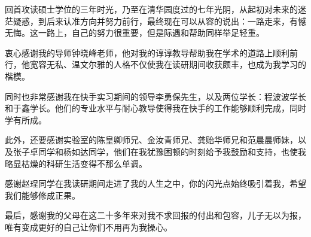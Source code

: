 \begin{acknowledgement}
  回首攻读硕士学位的三年时光，乃至在清华园度过的七年光阴，从起初对未来的迷茫疑惑，到后来认准方向并努力前行，最终现在可以从容的说出：一路走来，有憾无悔。这一路上，自己的努力很重要，但是际遇和帮助同样举足轻重。
  
  衷心感谢我的导师钟晓峰老师，他对我的谆谆教导帮助我在学术的道路上顺利前行，他宽容无私、温文尔雅的人格不仅使我在读研期间收获颇丰，也成为我学习的楷模。
  
  同时也非常感谢我在快手实习期间的领导李勇保先生，以及两位学长：程波波学长和于鑫学长。他们的专业水平与耐心教导使得我在快手的工作能够顺利完成，同时学有所成。
  
  此外，还要感谢实验室的陈皇卿师兄、金汝青师兄、龚贻华师兄和范晨晨师妹，以及张子卓同学和杨如达同学，他们在我犹豫困顿的时刻给予我鼓励和支持，也使我略显枯燥的科研生活变得不那么单调。
  
  感谢赵珵同学在我读研期间走进了我的人生之中，你的闪光点始终吸引着我，希望我们能够修成正果。
  
  最后，感谢我的父母在这二十多年来对我不求回报的付出和包容，儿子无以为报，唯有变成更好的自己让你们不用再为我操心。
\end{acknowledgement}
